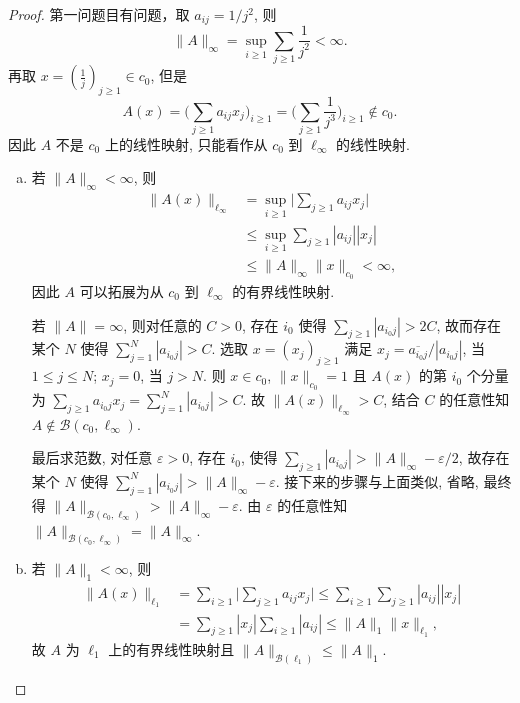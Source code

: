 \begin{proof}
  第一问题目有问题，取 $a_{ij} = 1/j^2$, 则
  \[ \|A\|_\infty = \sup_{i\geq 1} \sum_{j\geq 1} \frac{1}{j^2} < \infty. \]
  再取 $x = (\frac1j)_{j\geq 1} \in c_0$, 但是
  \[ A(x) = \biggl(\sum_{j\geq 1} a_{ij} x_j\biggr)_{i\geq 1}
      = \biggl(\sum_{j\geq 1} \frac{1}{j^3}\biggr)_{i\geq 1} \notin c_0. \]
  因此 $A$ 不是 $c_0$ 上的线性映射, 只能看作从 $c_0$ 到 $\ell_\infty$ 的线性映射.
  \begin{enumerate}[(a)]
    \item %
      若 $\|A\|_\infty < \infty$, 则
      \begin{align*}
        \|A(x)\|_{\ell_\infty}
        & = \sup_{i\geq 1} \biggl|\sum_{j\geq 1} a_{ij} x_j\biggr| \\
        & \leq \sup_{i\geq 1} \sum_{j\geq 1} |a_{ij}| |x_j| \\
        & \leq \|A\|_\infty \|x\|_{c_0} < \infty,
      \end{align*}
      因此 $A$ 可以拓展为从 $c_0$ 到 $\ell_\infty$ 的有界线性映射.

      若 $\|A\|=\infty$, 则对任意的 $C>0$, 存在 $i_0$ 使得 $\sum_{j\geq 1} |a_{i_0j}| > 2C$,
      故而存在某个 $N$ 使得 $\sum_{j=1}^N |a_{i_0j}| > C$.
      选取 $x = (x_j)_{j\geq 1}$ 满足 $x_j = \overline{a_{i_0j}}/|a_{i_0j}|$, 当 $1\leq j\leq N$;
      $x_j = 0$, 当 $j>N$. 则 $x\in c_0$, $\|x\|_{c_0}=1$ 且 $A(x)$ 的第 $i_0$ 个分量为
      $\sum_{j\geq 1} a_{i_0j} x_j = \sum_{j=1}^N |a_{i_0j}|>C$.
      故 $\|A(x)\|_{\ell_\infty}>C$, 结合 $C$ 的任意性知 $A\notin \mathcal{B}(c_0,\ell_\infty)$.

      最后求范数, 对任意 $\varepsilon>0$, 存在 $i_0$, 使得 $\sum_{j\geq 1} |a_{i_0j}| > \|A\|_\infty - \varepsilon/2$,
      故存在某个 $N$ 使得 $\sum_{j=1}^N |a_{i_0j}| > \|A\|_\infty - \varepsilon$.
      接下来的步骤与上面类似, 省略, 最终得 $\|A\|_{\mathcal{B}(c_0,\ell_\infty)} > \|A\|_\infty - \varepsilon$.
      由 $\varepsilon$ 的任意性知 $\|A\|_{\mathcal{B}(c_0,\ell_\infty)} = \|A\|_\infty$.
    \item %
      若 $\|A\|_1<\infty$, 则
      \begin{align*}
        \|A(x)\|_{\ell_1}
        & = \sum_{i\geq 1} \biggl|\sum_{j\geq 1} a_{ij}x_j\biggr|
          \leq \sum_{i\geq 1} \sum_{j\geq 1} |a_{ij}| |x_j| \\
        & = \sum_{j\geq 1} |x_j| \sum_{i\geq 1} |a_{ij}|
          \leq \|A\|_1 \|x\|_{\ell_1},
      \end{align*}
      故 $A$ 为 $\ell_1$ 上的有界线性映射且 $\|A\|_{\mathcal{B}(\ell_1)} \leq \|A\|_1$.


\end{enumerate}
\end{proof}

